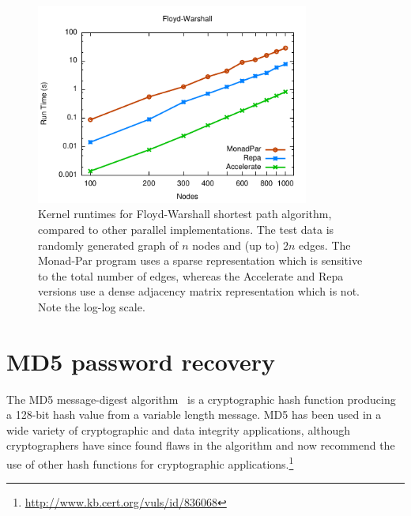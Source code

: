 \begin{figure}
    \centering
    \includegraphics[width=0.8\textwidth]{images/sec-6/floyd-warshall/floyd-warshall}
    \caption[Floyd-Warshall shortest path benchmark]{Kernel runtimes for
    Floyd-Warshall shortest path algorithm, compared to other parallel
    implementations. The test data is randomly generated graph of $n$ nodes and
    (up to) $2n$ edges. The Monad-Par program uses a sparse representation which
    is sensitive to the total number of edges, whereas the Accelerate and Repa
    versions use a dense adjacency matrix representation which is not. Note the
    log-log scale.}
    \label{fig:floyd_warshall}
\end{figure}


\section{MD5 password recovery}

The MD5 message-digest algorithm~\cite{Rivest:1992va} is a cryptographic hash
function producing a 128-bit hash value from a variable length message. MD5 has
been used in a wide variety of cryptographic and data integrity applications,
although cryptographers have since found flaws in the algorithm and now
recommend the use of other hash functions for cryptographic
applications.\footnote{\url{http://www.kb.cert.org/vuls/id/836068}}

